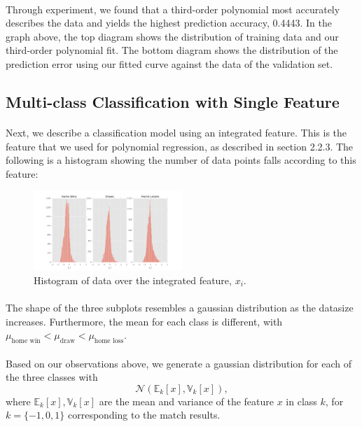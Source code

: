 \documentclass[12pt]{article}
\begin{document}
\paragraph{}
Through experiment, we found that a third-order polynomial most accurately describes the data and yields the highest prediction accuracy, 0.4443. In the graph above, the top diagram shows the distribution of training data and our third-order polynomial fit. The bottom diagram shows the distribution of the prediction error using our fitted curve against the data of the validation set.

\subsection{Multi-class Classification with Single Feature}
\paragraph{}
Next, we describe a classification model using an integrated feature. This is the feature that we used for polynomial regression, as described in section 2.2.3. The following is a histogram showing the number of data points falls according to this feature:
\begin{figure}[!ht]
	\centering
	\includegraphics[width=0.5\textwidth]{1D_all.png}
	\caption{Histogram of data over the integrated feature, $x_i$.}
\end{figure}
\paragraph{}
The shape of the three subplots resembles a gaussian distribution as the datasize increases. Furthermore, the mean for each class is different, with $\mu_{\text{home win}} < \mu_{\text{draw}} < \mu_{\text{home loss}}$.
\paragraph{}
Based on our observations above, we generate a gaussian distribution for each of the three classes with \[
\mathcal{N} (\mathbb{E}_k[x], \mathbb{V}_k[x]),
\] where $\mathbb{E}_k[x], \mathbb{V}_k[x]$ are the mean and variance of the feature $x$ in class $k$, for $k = \{-1, 0, 1\}$ corresponding to the match results.
\end{document}
